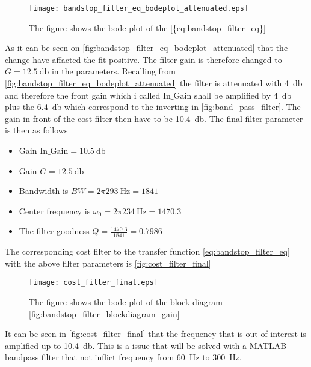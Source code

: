 \begin{figure}[H]
	\centering
	\texttt{[image: bandstop\_filter\_eq\_bodeplot\_attenuated.eps]}
	\caption{The figure shows the bode plot of the \autoref{{eq:bandstop_filter_eq}}}
		\label{fig:bandstop_filter_eq_bodeplot_attenuated}
\end{figure}


As it can be seen on \autoref{fig:bandstop_filter_eq_bodeplot_attenuated} that the change have affacted the fit positive. The filter gain is therefore changed to  $G = \SI{12.5}{\decibel}$ in the parameters. Recalling from \autoref{fig:bandstop_filter_eq_bodeplot_attenuated} the filter is attenuated with \SI{4}{\decibel} and therefore the front gain which i called $\text{In_Gain}$ shall be amplified by \SI{4}{\decibel} plus the \SI{6.4}{\decibel} which correspond to the inverting in \autoref{fig:band_pass_filter}. The gain in front of the cost filter then have to be \SI{10.4}{\decibel}. The final filter parameter is then as follows




\begin{itemize}
\item Gain $\text{In_Gain} = \SI{10.5}{\decibel}$
\item Gain $G = \SI{12.5}{\decibel}$
\item Bandwidth is $BW = 2\pi \SI{293}{\hertz} = 1841$
\item Center frequency is $\omega_0 = 2\pi \SI{234}{\hertz} = 1470.3$
\item The filter goodness $Q = \frac{1470.3}{1841} = 0.7986$
\end{itemize}




The corresponding cost filter to the transfer function \autoref{eq:bandstop_filter_eq} with the above filter parameters is \autoref{fig:cost_filter_final}

\begin{figure}[H]
	\centering
	\texttt{[image: cost\_filter\_final.eps]}
	\caption{The figure shows the bode plot of the block diagram \autoref{fig:bandstop_filter_blockdiagram_gain}}
		\label{fig:cost_filter_final}
\end{figure}

It can be seen in \autoref{fig:cost_filter_final} that the frequency that is out of interest is amplified up to \SI{10.4}{\decibel}. This is a issue that will be solved with a MATLAB bandpass filter that not inflict frequency from \SI{60}{\hertz} to \SI{300}{\hertz}.
 



